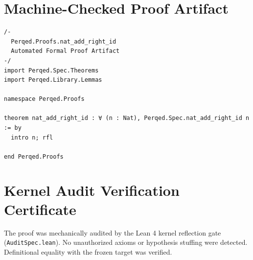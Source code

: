 \documentclass[11pt,a4paper]{article}
\begin{document}
\section{Machine-Checked Proof Artifact}
\begin{lstlisting}[language=Lean]
/-
  Perqed.Proofs.nat_add_right_id
  Automated Formal Proof Artifact
-/
import Perqed.Spec.Theorems
import Perqed.Library.Lemmas

namespace Perqed.Proofs

theorem nat_add_right_id : ∀ (n : Nat), Perqed.Spec.nat_add_right_id n := by
  intro n; rfl

end Perqed.Proofs
\end{lstlisting}

\section{Kernel Audit Verification Certificate}
The proof was mechanically audited by the Lean 4 kernel reflection gate (\texttt{AuditSpec.lean}). No unauthorized axioms or hypothesis stuffing were detected. Definitional equality with the frozen target was verified.
\end{document}
